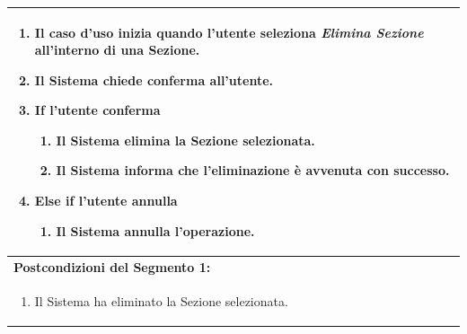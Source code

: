 \documentclass{article}
\begin{document}
\begin{table}[H]
\begin{tabular}{|p{\linewidth}|}
\begin{enumerate}
                            \item Il caso d'uso inizia quando l'utente seleziona \textit{Elimina Sezione} all'interno di una Sezione.
                            \item Il Sistema chiede conferma all'utente.
                            \item \textbf{If} l'utente conferma
                            \begin{enumerate}
                                \item Il Sistema elimina la Sezione selezionata.
                                \item Il Sistema informa che l'eliminazione è avvenuta con successo.
                            \end{enumerate}
                            \item \textbf{Else if} l'utente annulla
                            \begin{enumerate}
                                \item Il Sistema annulla l'operazione.
                            \end{enumerate}
                        \end{enumerate} \\
                        \hline
                        \cellcolor{gray!20}
                        \textbf{Postcondizioni del Segmento 1:} \\
                        \cellcolor{gray!20}
                        \begin{minipage}{\linewidth}
                            \begin{enumerate}
                                \item Il Sistema ha eliminato la Sezione selezionata.
                            \end{enumerate}
                        \end{minipage} \\
                        \hline
                    \end{tabular}
                \end{table}
                
\end{document}
